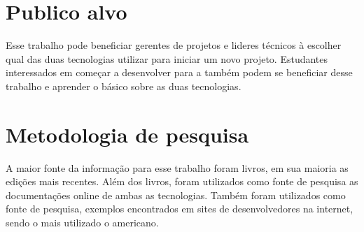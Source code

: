 \section{Publico alvo}
\label{sec:publicalvo}

Esse trabalho pode beneficiar gerentes de projetos e lideres técnicos à escolher qual das duas tecnologias utilizar para iniciar um novo projeto. Estudantes interessados em começar a desenvolver para a  também podem se beneficiar desse trabalho e aprender o básico sobre as duas tecnologias.

\section{Metodologia de pesquisa}
\label{sec:metodologiapesquisa}

A maior fonte da informação para esse trabalho foram livros, em sua maioria as edições mais recentes. Além dos livros, foram utilizados como fonte de pesquisa as documentações online de ambas as tecnologias. Também foram utilizados como fonte de pesquisa, exemplos encontrados em sites de desenvolvedores na internet, sendo o mais utilizado o  americano.